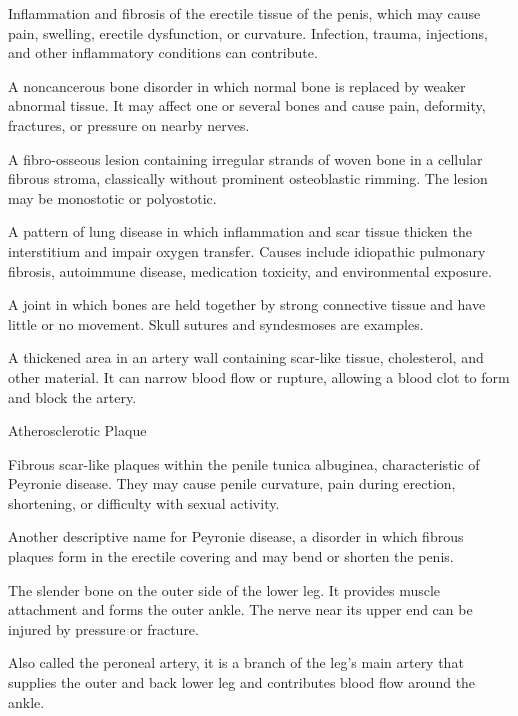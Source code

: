  Inflammation and fibrosis of the erectile tissue of the penis, which may cause pain, swelling, erectile dysfunction, or curvature. Infection, trauma, injections, and other inflammatory conditions can contribute.

 A noncancerous bone disorder in which normal bone is replaced by weaker abnormal tissue. It may affect one or several bones and cause pain, deformity, fractures, or pressure on nearby nerves.

 A fibro-osseous lesion containing irregular strands of woven bone in a cellular fibrous stroma, classically without prominent osteoblastic rimming. The lesion may be monostotic or polyostotic.

 A pattern of lung disease in which inflammation and scar tissue thicken the interstitium and impair oxygen transfer. Causes include idiopathic pulmonary fibrosis, autoimmune disease, medication toxicity, and environmental exposure.

 A joint in which bones are held together by strong connective tissue and have little or no movement. Skull sutures and syndesmoses are examples.

 A thickened area in an artery wall containing scar-like tissue, cholesterol, and other material. It can narrow blood flow or rupture, allowing a blood clot to form and block the artery.

\synonyms
Atherosclerotic Plaque

 Fibrous scar-like plaques within the penile tunica albuginea, characteristic of Peyronie disease. They may cause penile curvature, pain during erection, shortening, or difficulty with sexual activity.

 Another descriptive name for Peyronie disease, a disorder in which fibrous plaques form in the erectile covering and may bend or shorten the penis.

 The slender bone on the outer side of the lower leg. It provides muscle attachment and forms the outer ankle. The nerve near its upper end can be injured by pressure or fracture.

 Also called the peroneal artery, it is a branch of the leg’s main artery that supplies the outer and back lower leg and contributes blood flow around the ankle.

